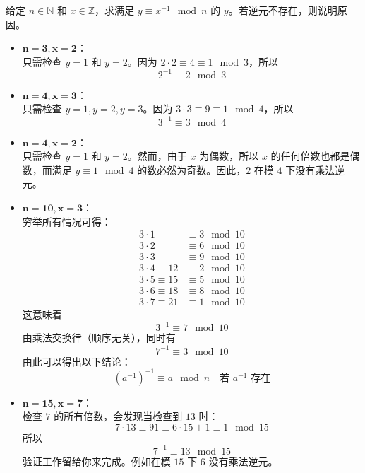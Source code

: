 \begin{example}
    给定 $n \in \mathbb{N}$ 和 $x \in \mathbb{Z}$，求满足 $y \equiv x^{-1} \mod n$ 的 $y$。若逆元不存在，则说明原因。
    \begin{itemize}
        \item $\mathbf{n=3, x=2}$：\\
            只需检查 $y = 1$ 和 $y = 2$。因为 $2 \cdot 2 \equiv 4 \equiv 1 \mod 3$，所以
            \[2^{-1} \equiv 2 \mod 3\]
        \item $\mathbf{n=4, x=3}$：\\
            只需检查 $y = 1, y = 2, y = 3$。因为 $3 \cdot 3 \equiv 9 \equiv 1 \mod 4$，所以
            \[3^{-1} \equiv 3 \mod 4\]
        \item $\mathbf{n=4, x=2}$：\\
            只需检查 $y = 1$ 和 $y = 2$。然而，由于 $x$ 为偶数，所以 $x$ 的任何倍数也都是偶数，而满足 $y \equiv 1 \mod 4$ 的数必然为奇数。因此，$2$ 在模 $4$ 下没有乘法逆元。
        \item $\mathbf{n=10, x=3}$：\\
            穷举所有情况可得：
            \begin{align*}
                3 \cdot 1 &\equiv 3 \mod 10 \\
                3 \cdot 2 &\equiv 6 \mod 10 \\
                3 \cdot 3 &\equiv 9 \mod 10 \\
                3 \cdot 4 \equiv 12 &\equiv 2 \mod 10 \\
                3 \cdot 5 \equiv 15 &\equiv 5 \mod 10 \\
                3 \cdot 6 \equiv 18 &\equiv 8 \mod 10 \\
                3 \cdot 7 \equiv 21 &\equiv 1 \mod 10
            \end{align*}
            这意味着
            \[3^{-1} \equiv 7 \mod 10\]
            由乘法交换律（顺序无关），同时有
            \[7^{-1} \equiv 3 \mod 10\]
            由此可以得出以下结论：
            \[(a^{-1})^{-1} \equiv a \mod n \quad \text{若\ } a^{-1} \text{\ 存在}\]
        \item $\mathbf{n=15, x=7}$：\\
            检查 $7$ 的所有倍数，会发现当检查到 $13$ 时：
            \[7 \cdot 13 \equiv 91 \equiv 6 \cdot 15 + 1 ≡ 1 \mod 15\]
            所以
            \[7^{-1} \equiv 13 \mod 15\]
            验证工作留给你来完成。例如在模 $15$ 下 $6$ 没有乘法逆元。 
    \end{itemize}
\end{example}

